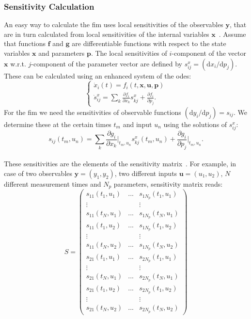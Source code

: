 \documentclass[graybox]{svmult}
\newcommand{\mbx}{\mathbf{x}}
\newcommand{\mbu}{\mathbf{u}}
\newcommand{\mbp}{\mathbf{p}}
\newcommand{\mby}{\mathbf{y}}
\newcommand{\mbg}{\mathbf{g}}
\newcommand{\mbf}{\mathbf{f}}
\begin{document}
\subsubsection{Sensitivity Calculation}
An easy way to calculate the \ac{fim} uses local sensitivities of the observables $\mby$, that are in turn calculated from local sensitivities of the internal variables $\mbx$~\cite{versyckIntroducingOptimal1999, banks_generalized_2010}.
Assume that functions $\mbf$ and $\mbg$ are differentiable functions with respect to the state variables $\mbx$ and parameters $\mbp$.
The local sensitivities of $i$-component of the vector $\mbx$ w.r.t. $j$-component of the parameter vector are defined by $s^x_{ij} = (\mathrm{d} x_i / \mathrm{d} p_j)$.
These can be calculated using an enhanced system of the \acp{ode}:
\begin{equation}
    \begin{cases}
    \dot x_i (t) = f_i(t, \mbx, \mbu, \mbp)\\
    \dot s^x_{ij} = \sum_k \frac{\partial f_i}{\partial x_k} s^x_{kj} + \frac{\partial f_i}{\partial p_j}.
    \label{eq:ode_and_sensitiv}
    \end{cases}
\end{equation}
For the \ac{fim} we need the sensitivities of observable functions $(\mathrm{d} y_i / \mathrm{d} p_j) = s_{ij}$.
We determine these at the certain times $t_m$ and input $u_n$ using the solutions of $s^x_{ij}$:
\begin{equation}
    s_{ij} (t_m, u_n) = \sum_k \frac{\partial g_i}{\partial x_k}\bigg|_{t_m, u_n} s_{kj}^x (t_m, u_n) + \frac{\partial g_i}{\partial p_j}\bigg|_{t_m, u_n}.
\label{eq:observ_sensitivities}
\end{equation}
\\
These sensitivities are the elements of the sensitivity matrix~\cite{stigterObservabilityComplex2017}.
For example, in case of two observables $\mby = (y_1, y_2)$, two different inputs $\mbu = (u_1, u_2)$, $N$ different measurement times and $N_p$ parameters, sensitivity matrix reads:
%
\begin{equation}
    S =
\begin{pmatrix}
s_{11} (t_1, u_1) & ... & s_{1 N_p}(t_1, u_1) \\
\vdots  &   & \vdots  \\
s_{11} (t_{N}, u_1) & ... & s_{1 N_p} (t_{N}, u_1)\\
s_{11} (t_1, u_2) & ... & s_{1 N_p}(t_1, u_2) \\
\vdots  &   & \vdots  \\
s_{11} (t_N, u_2) & ... & s_{1 N_p} (t_N, u_2)\\

s_{21} (t_1, u_1) & ... & s_{2 N_p}(t_1, u_1) \\
\vdots  &   & \vdots  \\
s_{21} (t_{N}, u_1) & ... & s_{2 N_p} (t_{N}, u_1)\\
s_{21} (t_1, u_2) & ... & s_{2 N_p}(t_1, u_2) \\
\vdots  &   & \vdots  \\
s_{21} (t_N, u_2) & ... & s_{2 N_p} (t_N, u_2)
\end{pmatrix}
\label{eq:sens_matrix}
\end{equation}
\end{document}
